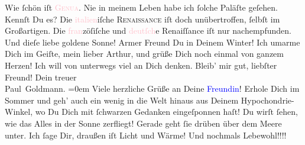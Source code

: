            \pstart
           Wie ſchön iſt \textsc{\textcolor{pink}{Genua}{}\ledrightnote{\textcolor{pink}{Genua}}}. Nie in meinem Leben habe ich ſolche Paläſte geſehen. Kennſt Du es? Die \textcolor{pink}{italien}{}\ledrightnote{\textcolor{pink}{Italien}}iſche \textsc{Renaissance} iſt doch unübertroffen, ſelbſt im Großartigen. Die \textcolor{pink}{fran}{}zöſiſche und \textcolor{pink}{deutſch}{}e Renaiſſance iſt nur
               nachempfunden.\pend
           \pstart
           Und dieſe liebe goldene Sonne! Armer Freund Du in Deinem Winter!\pend
           \pstart
           Ich umarme Dich im Geiſte, mein lieber Arthur, und grüße Dich noch einmal von ganzem
                  {\pb}Herzen! Ich will von unterwegs viel an Dich
               denken. Bleib’ mir gut, liebſter Freund!\pend
           \pstart
           Dein treuer {\\[\baselineskip]}\spacefill\mbox{Paul Goldmann.}\pend
           \leftskip=0em{}\pstart
           \noindent{}Viele herzliche Grüße an Deine \textcolor{blue}{Freundin}{}!\pend
           \pstart
           Erhole Dich im Sommer und geh’ auch ein wenig in die Welt hinaus aus Deinem
                  Hypochondrie-Winkel, wo Du Dich mit ſchwarzen Gedanken eingeſponnen haſt! Du wirſt
                  ſehen, wie das Alles in der Sonne zerfliegt! Gerade geht ſie drüben über dem Meere
                  unter. Ich ſage Dir, draußen iſt Licht und Wärme!\pend
           \pstart
           Und nochmals Lebewohl!!!!\pend
           \endnumbering{}\begin{anhang}\end{anhang}
      